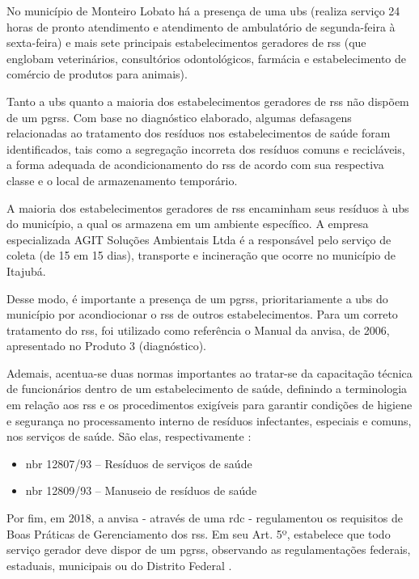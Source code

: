 	No município de Monteiro Lobato há a presença de uma \gls{ubs} (realiza serviço 24 horas de pronto atendimento e atendimento de ambulatório de segunda-feira à sexta-feira) e mais sete principais estabelecimentos geradores de \gls{rss} (que englobam veterinários, consultórios odontológicos, farmácia e estabelecimento de comércio de produtos para animais). 
		
	Tanto a \gls{ubs} quanto a maioria dos estabelecimentos geradores de \gls{rss} não dispõem de um \gls{pgrss}. Com base no diagnóstico elaborado, algumas defasagens relacionadas ao tratamento dos resíduos nos estabelecimentos de saúde foram identificados, tais como a segregação incorreta dos resíduos comuns e recicláveis, a forma adequada de acondicionamento do \gls{rss} de acordo com sua respectiva classe e o local de armazenamento temporário.
	
	A maioria dos estabelecimentos geradores de \gls{rss} encaminham seus resíduos à \gls{ubs} do município, a qual os armazena em um ambiente específico. A  empresa especializada AGIT Soluções Ambientais Ltda é a responsável pelo serviço de coleta (de 15 em 15 dias), transporte e incineração que ocorre no município de Itajubá. 
	
	Desse modo, é importante a presença de um \gls{pgrss}, prioritariamente a \gls{ubs} do município por acondiocionar o \gls{rss} de outros estabelecimentos. Para um correto tratamento do \gls{rss}, foi utilizado como referência o Manual da \gls{anvisa}, de 2006, apresentado no Produto 3 (diagnóstico).
	
	Ademais, acentua-se duas normas importantes ao tratar-se da capacitação técnica de funcionários dentro de um estabelecimento de saúde, definindo a terminologia em relação aos \gls{rss} e os procedimentos exigíveis para garantir condições de higiene e segurança no processamento interno de resíduos infectantes, especiais e comuns, nos serviços de saúde. São elas, respectivamente \cite{abnt:12807:1993, abnt:12809:1993}:
	
	\begin{itemize}
		\item \gls{nbr} 12807/93 – Resíduos de serviços de saúde
		\item \gls{nbr} 12809/93 – Manuseio de resíduos de saúde
	\end{itemize}
	
	Por fim, em 2018, a \gls{anvisa} - através de uma \gls{rdc} - regulamentou os requisitos de Boas Práticas de Gerenciamento dos \gls{rss}. Em seu Art. 5º, estabelece que todo serviço gerador deve dispor de um \gls{pgrss}, observando as regulamentações federais, estaduais, municipais ou do Distrito Federal \cite{anvisa:222:2018}.

